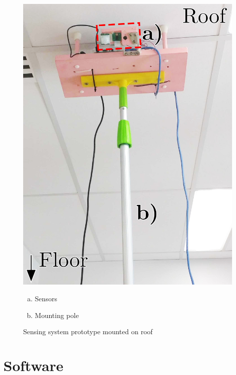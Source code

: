 \documentclass[../thesis/thesis.tex]{subfiles}
\begin{document}
\begin{figure}
\centering
\includegraphics[height=0.7\textheight]{../diagrams/prototype-mounted-ceiling.jpg}
\begin{enumerate}[a)]
 \item Sensors
 \item Mounting pole
\end{enumerate}
\caption{Sensing system prototype mounted on roof}
\label{fig:pictures:protoact}
\end{figure}

\clearpage{}

\section{Software}
\end{document}
